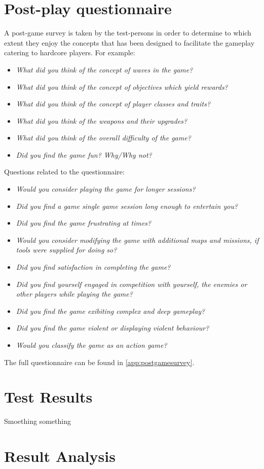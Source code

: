 \section{Post-play questionnaire}
A post-game survey is taken by the test-persons in order to determine to which extent they enjoy the concepts that has been designed to facilitate the gameplay catering to hardcore players.
For example:
\begin{itemize}
\item \emph{What did you think of the concept of waves in the game?}
\item \emph{What did you think of the concept of objectives which yield rewards?}
\item \emph{What did you think of the concept of player classes and traits?}
\item \emph{What did you think of the weapons and their upgrades?}
\item \emph{What did you think of the overall difficulty of the game?}
\item \emph{Did you find the game fun? Why/Why not?}
\end{itemize}

Questions related to the questionnaire:
\begin{itemize}
    \item \emph{Would you consider playing the game for longer sessions?}
    \item \emph{Did you find a game single game session long enough to entertain you?}
    \item \emph{Did you find the game frustrating at times?}
    \item \emph{Would you consider modifying the game with additional maps and missions, if tools were supplied for doing so?}
    \item \emph{Did you find satisfaction in completing the game?}
    \item \emph{Did you find yourself engaged in competition with yourself, the enemies or other players while playing the game?}
    \item \emph{Did you find the game exibiting complex and deep gameplay?}
    \item \emph{Did you find the game violent or displaying violent behaviour?}
    \item \emph{Would you classify the game as an action game?}
\end{itemize}
The full questionnaire can be found in \ref{app:postgamesurvey}.

\section{Test Results}
Smoething something

\section{Result Analysis}
